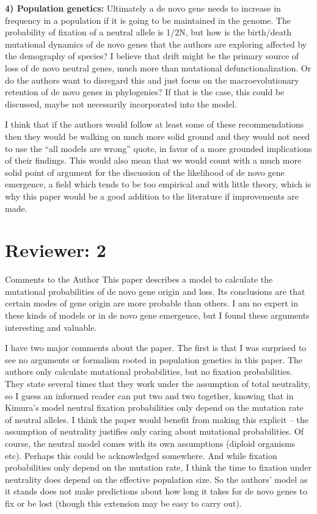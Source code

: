\documentclass[12pt,a4paper]{article}
\begin{document}
\vspace{\baselineskip}

\textbf{4) Population genetics:} Ultimately a de novo gene needs to increase in frequency in a population if it is going to be maintained in the genome. The probability of fixation of a neutral allele is 1/2N, but how is the birth/death mutational dynamics of de novo genes that the authors are exploring affected by the demography of species? I believe that drift might be the primary source of loss of de novo neutral genes, much more than mutational defunctionalization. Or do the authors want to disregard this and just focus on the macroevolutionary retention of de novo genes in phylogenies? If that is the case, this could be discussed, maybe not necessarily incorporated into the model.

\vspace{\baselineskip}

I think that if the authors would follow at least some of these recommendations then they would be walking on much more solid ground and they would not need to use the ``all models are wrong'' quote, in favor of a more grounded implications of their findings. This would also mean that we would count with a much more solid point of argument for the discussion of the likelihood of de novo gene emergence, a field which tends to be too empirical and with little theory, which is why this paper would be a good addition to the literature if improvements are made.

\section*{Reviewer: 2}

Comments to the Author
This paper describes a model to calculate the mutational probabilities of de novo gene origin and loss. Its conclusions are that certain modes of gene origin are more probable than others. I am no expert in these kinds of models or in de novo gene emergence, but I found these arguments interesting and valuable.

I have two major comments about the paper. The first is that I was surprised to see no arguments or formalism rooted in population genetics in this paper. The authors only calculate mutational probabilities, but no fixation probabilities. They state several times that they work under the assumption of total neutrality, so I guess an informed reader can put two and two together, knowing that in Kimura's model neutral fixation probabilities only depend on the mutation rate of neutral alleles. I think the paper would benefit from making this explicit -- the assumption of neutrality justifies only caring about mutational probabilities. Of course, the neutral model comes with its own assumptions (diploid organisms  etc). Perhaps this could be acknowledged somewhere. And while fixation probabilities only depend on the mutation rate, I think the time to fixation under neutrality does depend on the effective population size. So the authors' model as it stands does not make predictions about how long it takes for de novo genes to fix or be lost (though this extension may be easy to carry out).
\end{document}
